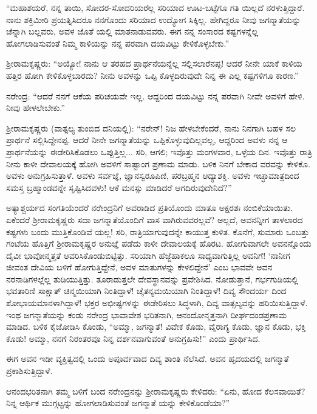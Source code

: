 “ಮಹಾಶಯರೆ, ನನ್ನ ತಾಯಿ, ಸೋದರ-ಸೋದರಿಯರೆಲ್ಲ ಸರಿಯಾದ ಊಟ-ಬಟ್ಟೆಗೂ ಗತಿ ಯಿಲ್ಲದೆ ನರಳುತ್ತಿದ್ದಾರೆ. ನಾನು ಶಕ್ತಿಮೀರಿ ಪ್ರಯತ್ನಿಸಿದರೂ ನನಗೊಂದು ಸರಿಯಾದ ಉದ್ಯೋಗ ಸಿಕ್ಕಿಲ್ಲ. ಹೇಗಿದ್ದರೂ ನೀವು ಜಗನ್ಮಾತೆಯನ್ನು ಚೆನ್ನಾಗಿ ಬಲ್ಲವರು, ಅವಳ ಜೊತೆ ಯಲ್ಲಿ ಮಾತನಾಡುವವರು. ಈಗ ನನ್ನ ಸಂಸಾರದ ಕಷ್ಟಗಳನ್ನೆಲ್ಲ ಹೋಗಲಾಡಿಸುವಂತೆ ನಿಮ್ಮ ಕಾಳಿಯನ್ನು ನನ್ನ ಪರವಾಗಿ ದಯವಿಟ್ಟು ಕೇಳಿಕೊಳ್ಳಬೇಕು.”

ಶ್ರೀರಾಮಕೃಷ್ಣರು: “ಅಯ್ಯೋ! ನಾನು ಆ ತರಹದ ಪ್ರಾರ್ಥನೆಯನ್ನೆಲ್ಲ ಸಲ್ಲಿಸಲಾರೆನಪ್ಪ! ಆದರೆ ನೀನೇ ಯಾಕೆ ಕಾಳಿಯ ಹತ್ತಿರ ಹೋಗಿ ಕೇಳಿಕೊಳ್ಳಬಾರದು? ನೀನು ಅವಳನ್ನು ಒಪ್ಪಿ ಕೊಳ್ಳದಿರುವುದೇ ನಿನ್ನ ಈ ಎಲ್ಲ ಕಷ್ಟಗಳಿಗೂ ಕಾರಣ.”

ನರೇಂದ್ರ: “ಆದರೆ ನನಗೆ ಆಕೆಯ ಪರಿಚಯವೇ ಇಲ್ಲ. ಆದ್ದರಿಂದ ದಯವಿಟ್ಟು ನನ್ನ ಪರವಾಗಿ ನೀವೇ ಅವಳಿಗೆ ಹೇಳಿ. ನೀವು ಹೇಳಲೇಬೇಕು.”

ಶ್ರೀರಾಮಕೃಷ್ಣರು (ವಾತ್ಸಲ್ಯ ತುಂಬಿದ ದನಿಯಲ್ಲಿ): “ನರೇನ್! ನಿಜ ಹೇಳಬೇಕೆಂದರೆ, ನಾನು ನಿನಗಾಗಿ ಬಹಳ ಸಲ ಪ್ರಾರ್ಥನೆ ಸಲ್ಲಿಸಿದ್ದೇನಪ್ಪ. ಆದರೆ ನೀನೇ ಜಗನ್ಮಾತೆಯನ್ನು ಒಪ್ಪಿಕೊಳ್ಳುವುದಿಲ್ಲವಲ್ಲ, ಆದ್ದರಿಂದ ಅವಳು ನನ್ನ ಆ ಪ್ರಾರ್ಥನೆಯನ್ನು ಈಡೇರಿಸಿಕೊಡಲು ಒಪ್ಪುತ್ತಿಲ್ಲ... ಸರಿ, ಆಗಲಿ; ಇವೊತ್ತು ಮಂಗಳವಾರ, ಒಳ್ಳೆಯ ದಿನ. ಇವೊತ್ತು ರಾತ್ರಿ ನೀನು ಕಾಳೀ ದೇವಾಲಯಕ್ಕೆ ಹೋಗಿ ಅವಳಿಗೆ ಸಾಷ್ಟಾಂಗ ಪ್ರಣಾಮ ಮಾಡು. ಬಳಿಕ ನಿನಗೆ ಬೇಕಾದ ವರವನ್ನು ಕೇಳಿಕೊ. ಅವಳು ಅನುಗ್ರಹಿಸುತ್ತಾಳೆ. ಅವಳು ಸರ್ವಜ್ಞೆ, ಜ್ಞಾನಸ್ವರೂಪಿಣಿ, ಪರಬ್ರಹ್ಮನ ಆದ್ಯಾಶಕ್ತಿ. ಅವಳು ಇಚ್ಛಾಮಾತ್ರದಿಂದ ಸಮಸ್ತ ಬ್ರಹ್ಮಾಂಡವನ್ನೇ ಸೃಷ್ಟಿಸಿದವಳು! ಆಕೆ ಮನಸ್ಸು ಮಾಡಿದರೆ ಆಗದಿರುವುದೇನಿದೆ?”

ಅತ್ಯಾಶ್ಚರ್ಯದ ಸಂಗತಿಯೆಂದರೆ ನರೇಂದ್ರನಿಗೆ ಅವರಾಡಿದ ಪ್ರತಿಯೊಂದು ಮಾತೂ ಅಕ್ಷರಶಃ ನಂಬಿಕೆಯಾಯಿತು. ಏಕೆಂದರೆ ಶ್ರೀರಾಮಕೃಷ್ಣರು ಸದಾ ಜಗನ್ಮಾತೆಯೊಂದಿಗೆ ವಾಸ ವಾಗಿರುವವರಲ್ಲವೆ? ಅಲ್ಲದೆ, ಅವನನ್ನೀಗ ತಾಳಲಾರದ ಕಷ್ಟಗಳು ಬಂದು ಮುತ್ತಿಕೊಂಡಿವೆ ಯಲ್ಲ! ಸರಿ, ರಾತ್ರಿಯಾಗುವುದನ್ನೇ ಕಾಯುತ್ತ ಕುಳಿತ. ಕೊನೆಗೆ, ಸುಮಾರು ಒಂಬತ್ತು ಗಂಟೆಯ ಹೊತ್ತಿಗೆ ಶ್ರೀರಾಮಕೃಷ್ಣರ ಅನುಜ್ಞೆ ಪಡೆದು ಕಾಳೀ ದೇವಾಲಯಕ್ಕೆ ಹೊರಟ. ಹೋಗುವಾಗಲೇ ಅವನನ್ನೊಂದು ದೈವೀ ಭಾವೋನ್ಮತ್ತತೆ ಆವರಿಸಿಕೊಂಡುಬಿಟ್ಟಿತ್ತು. ಸರಿಯಾಗಿ ಹೆಜ್ಜೆಹಾಕಲೂ ಸಾಧ್ಯವಾಗುತ್ತಿಲ್ಲ ಅವನಿಗೆ! ‘ನಾನೀಗ ಜೀವಂತ ದೇವಿಯ ಬಳಿಗೆ ಹೋಗುತ್ತಿದ್ದೇನೆ, ಅವಳ ಮಾತುಗಳನ್ನು ಕೇಳಲಿದ್ದೇನೆ’ ಎಂಬ ಭಾವವೇ ಅವನ ನರನಾಡಿಗಳಲ್ಲೆಲ್ಲ ತುಡಿಯುತ್ತಿತ್ತು. ತೂರಾಡುತ್ತಲೇ ದೇವಸ್ಥಾನವನ್ನು ಪ್ರವೇಶಿಸಿದ. ನೋಡುತ್ತಾನೆ, ಗರ್ಭಗುಡಿಯಲ್ಲಿ ಭವತಾರಿಣಿ ಸಾಕ್ಷಾತ್ ಚಿನ್ಮಯಿಯಾಗಿ ನಿಂತಿದ್ದಾಳೆ! ಚೈತನ್ಯಮಯಿಯಾಗಿ ನಿಂತಿದ್ದಾಳೆ! ದಿವ್ಯ ಸೌಂದರ್ಯ ದಿಂದ ಶೋಭಾಯಮಾನಳಾಗಿದ್ದಾಳೆ! ಭಕ್ತರ ಅಭೀಷ್ಟಗಳನ್ನು ಈಡೇರಿಸಲು ಸಿದ್ಧಳಾಗಿ, ದಿವ್ಯ ವಾತ್ಸಲ್ಯವನ್ನು ಹರಿಯಿಸುತ್ತಿದ್ದಾಳೆ. ಇಂಥ ಜಗನ್ಮಾತೆಯನ್ನು ಕಂಡು ನರೇಂದ್ರ ಭಾವಾವೇಶ ಭರಿತನಾಗಿ, ಆನಂದೋನ್ಮತ್ತನಾಗಿ ದೀರ್ಘದಂಡಪ್ರಣಾಮ ಮಾಡಿದ. ಬಳಿಕ ಕೈಜೋಡಿಸಿ ಕೊಂಡು, “ಅಮ್ಮಾ, ಜಗನ್ಮಾತೆ! ವಿವೇಕ ಕೊಡು, ವೈರಾಗ್ಯ ಕೊಡು, ಜ್ಞಾನ ಕೊಡು, ಭಕ್ತಿ ಕೊಡು! ಅಮ್ಮಾ, ನನಗೆ ನಿರಂತರವೂ ನಿನ್ನ ದರ್ಶನವಾಗುವಂತೆ ಅನುಗ್ರಹಿಸು!” ಎಂದು ಪ್ರಾರ್ಥಿಸಿದ.

ಈಗ ಅವನ ಇಡೀ ವ್ಯಕ್ತಿತ್ವದಲ್ಲಿ ಒಂದು ಅಪೂರ್ವವಾದ ದಿವ್ಯ ಶಾಂತಿ ನೆಲೆಸಿದೆ. ಅವನ ಹೃದಯದಲ್ಲಿ ಜಗನ್ಮಾತೆ ಪ್ರಕಾಶಿಸುತ್ತಿದ್ದಾಳೆ.

ಆನಂದಭರಿತನಾಗಿ ತಮ್ಮ ಬಳಿಗೆ ಬಂದ ನರೇಂದ್ರನನ್ನು ಶ್ರೀರಾಮಕೃಷ್ಣರು ಕೇಳಿದರು: “ಏನು, ಹೋದ ಕೆಲಸವಾಯಿತೆ? ನಿನ್ನ ಆರ್ಥಿಕ ಮುಗ್ಗಟ್ಟನ್ನು ಹೋಗಲಾಡಿಸುವಂತೆ ಜಗನ್ಮಾತೆ ಯನ್ನು ಕೇಳಿಕೊಂಡೆಯಾ?”


